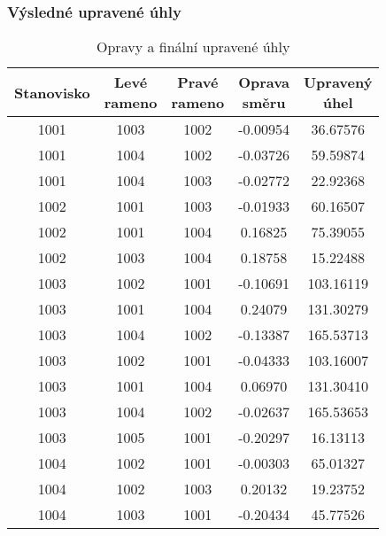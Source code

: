 \subsubsection{Výsledné upravené úhly}
\begin{table}[H]
    \centering
    \caption{Opravy a finální upravené úhly}
    \begin{tabular}{|c|c|c||c|c|}
        \hline
        \textbf{Stanovisko} & \makecell{\textbf{Levé}\\\textbf{rameno}} & \makecell{\textbf{Pravé}\\\textbf{rameno}} & \makecell{\textbf{Oprava}\\\textbf{směru}} & \makecell{\textbf{Upravený}\\\textbf{úhel}} \\
        \hline\hline
        1001 & 1003 & 1002 & -0.00954 & 36.67576 \\
        1001 & 1004 & 1002 & -0.03726 & 59.59874 \\
        1001 & 1004 & 1003 & -0.02772 & 22.92368 \\
        \hline
        1002 & 1001 & 1003 & -0.01933 & 60.16507 \\
        1002 & 1001 & 1004 & 0.16825 & 75.39055 \\
        1002 & 1003 & 1004 & 0.18758 & 15.22488 \\
        \hline
        1003 & 1002 & 1001 & -0.10691 & 103.16119 \\
        1003 & 1001 & 1004 & 0.24079 & 131.30279 \\
        1003 & 1004 & 1002 & -0.13387 & 165.53713 \\
        1003 & 1002 & 1001 & -0.04333 & 103.16007 \\
        1003 & 1001 & 1004 & 0.06970 & 131.30410 \\
        1003 & 1004 & 1002 & -0.02637 & 165.53653 \\
        1003 & 1005 & 1001 & -0.20297 & 16.13113 \\
        \hline
        1004 & 1002 & 1001 & -0.00303 & 65.01327 \\
        1004 & 1002 & 1003 & 0.20132 & 19.23752 \\
        1004 & 1003 & 1001 & -0.20434 & 45.77526 \\
        \hline
    \end{tabular}
\end{table}

